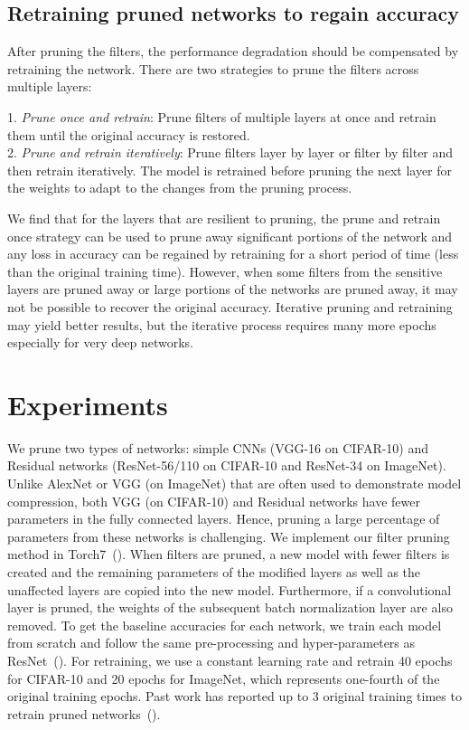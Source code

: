 \documentclass{article} \usepackage{iclr2017_conference,times}
\begin{document}
\subsection{Retraining pruned networks to regain accuracy}
\label{sec:retrain}


After pruning the filters, the performance degradation should be compensated by retraining the network.
There are two strategies to prune the filters across multiple layers:

1. \emph{Prune once and retrain}: Prune filters of multiple layers at once and retrain them until the original accuracy is restored.\\
2. \emph{Prune and retrain iteratively}: Prune filters layer by layer or filter by filter and then retrain iteratively.
The model is retrained before pruning the next layer for the weights to adapt to the changes from the pruning process.

We find that for the layers that are resilient to pruning, the prune and retrain once strategy can be used to prune away significant portions of the network and any loss in accuracy can be regained by retraining for a short period of time (less than the original training time). 
However, when some filters from the sensitive layers are pruned away or large portions of the networks are pruned away, it may not be possible to recover the original accuracy.
Iterative pruning and retraining may yield better results, but the iterative process requires many more epochs especially for very deep networks. \section{Experiments}
We prune two types of networks: simple CNNs (VGG-16 on CIFAR-10) and Residual networks (ResNet-56/110 on CIFAR-10 and ResNet-34 on ImageNet).
Unlike AlexNet or VGG (on ImageNet) that are often used to demonstrate model compression, both VGG (on CIFAR-10) and Residual networks have fewer parameters in the fully connected layers. 
Hence, pruning a large percentage of parameters from these networks is challenging.
We implement our filter pruning method in Torch7~(\cite{collobert2011torch7}). 
When filters are pruned, a new model with fewer filters is created and the remaining parameters of the modified layers as well as the unaffected layers are copied into the new model.
Furthermore, if a convolutional layer is pruned, the weights of the subsequent batch normalization layer are also removed.
To get the baseline accuracies for each network, we train each model from scratch and follow the same pre-processing and hyper-parameters as ResNet~(\cite{resnet}).
For retraining, we use a constant learning rate  and retrain 40 epochs for CIFAR-10 and 20 epochs for ImageNet, which represents one-fourth of the original training epochs.
Past work has reported up to 3 original training times to retrain pruned networks~(\cite{han2015learning}).
\end{document}
